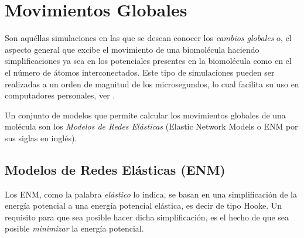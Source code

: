 \section{Movimientos Globales}

Son aqu\'{e}llas simulaciones en las que se desean conocer los \textit{cambios globales} o, el aspecto general que excibe el movimiento de una biomol\'{e}cula haciendo simplificaciones ya sea en los potenciales presentes en la biomol\'{e}cula como en el el n\'{u}mero de \'{a}tomos interconectados. Este tipo de simulaciones pueden ser realizadas a un orden de magnitud de los microsegundos, lo cual facilita su uso en computadores personales, ver \cite{glo}.

Un conjunto de modelos que permite calcular los movimientos globales de una mol\'{e}cula son los \textit{Modelos de Redes El\'{a}sticas} (Elastic Network Models o ENM por sus siglas en ingl\'{e}s).

\subsection{Modelos de Redes El\'{a}sticas (ENM)}
Los ENM, como la palabra \textit{el\'{a}stico} lo indica, se basan en una simplificaci\'{o}n de la energ\'{i}a potencial a una energ\'{i}a potencial el\'{a}stica, es decir de tipo Hooke. Un requisito para que sea posible hacer dicha simplificaci\'{o}n, es el hecho de que sea posible \textit{minimizar} la energ\'{i}a potencial.

